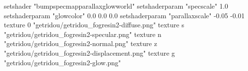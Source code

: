 setshader "bumpspecmapparallaxglowworld"
setshaderparam "specscale" 1.0
setshaderparam "glowcolor" 0.0 0.0 0.0
setshaderparam "parallaxscale" -0.05 -0.01
texture 0 "getridou/getridou_fogresin2-diffuse.png"
texture s "getridou/getridou_fogresin2-specular.png"
texture n "getridou/getridou_fogresin2-normal.png"
texture z "getridou/getridou_fogresin2-displacement.png"
texture g "getridou/getridou_fogresin2-glow.png"

